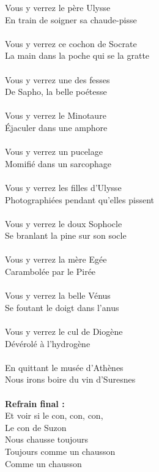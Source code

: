 \breakpage
Vous y verrez le père Ulysse
\\En train de soigner sa chaude-pisse
\\\\Vous y verrez ce cochon de Socrate
\\La main dans la poche qui se la gratte
\\\\Vous y verrez une des fesses
\\De Sapho, la belle poétesse
\\\\Vous y verrez le Minotaure
\\Éjaculer dans une amphore
\\\\Vous y verrez un pucelage
\\Momifié dans un sarcophage
\\\\Vous y verrez les filles d'Ulysse
\\Photographiées pendant qu'elles pissent
\\\\Vous y verrez le doux Sophocle
\\Se branlant la pine sur son socle
\\\\Vous y verrez la mère Egée
\\Carambolée par le Pirée
\\\\Vous y verrez la belle Vénus
\\Se foutant le doigt dans l'anus
\\\\Vous y verrez le cul de Diogène
\\Dévérolé à l'hydrogène
\\\\En quittant le musée d'Athènes
\\Nous irons boire du vin d'Suresnes
\\\\\textbf{Refrain final :}
\\Et voir si le con, con, con,
\\Le con de Suzon
\\Nous chausse toujours
\\Toujours comme un chausson
\\Comme un chausson

\breakpage